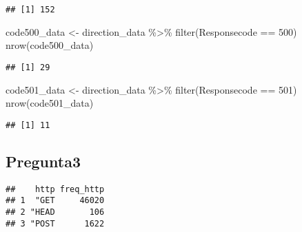 \documentclass[
]{article}
\newenvironment{Shaded}{\begin{snugshade}}{\end{snugshade}}
\newcommand{\AttributeTok}[1]{\textcolor[rgb]{0.77,0.63,0.00}{#1}}
\newcommand{\CommentTok}[1]{\textcolor[rgb]{0.56,0.35,0.01}{\textit{#1}}}
\newcommand{\DecValTok}[1]{\textcolor[rgb]{0.00,0.00,0.81}{#1}}
\newcommand{\FunctionTok}[1]{\textcolor[rgb]{0.00,0.00,0.00}{#1}}
\newcommand{\NormalTok}[1]{#1}
\newcommand{\OtherTok}[1]{\textcolor[rgb]{0.56,0.35,0.01}{#1}}
\newcommand{\SpecialCharTok}[1]{\textcolor[rgb]{0.00,0.00,0.00}{#1}}
\begin{document}
\begin{verbatim}
## [1] 152
\end{verbatim}

\begin{Shaded}
\begin{Highlighting}[]
\NormalTok{code500\_data }\OtherTok{\textless{}{-}}\NormalTok{ direction\_data }\SpecialCharTok{\%\textgreater{}\%} \FunctionTok{filter}\NormalTok{(Responsecode }\SpecialCharTok{==} \DecValTok{500}\NormalTok{)}
\FunctionTok{nrow}\NormalTok{(code500\_data)}
\end{Highlighting}
\end{Shaded}

\begin{verbatim}
## [1] 29
\end{verbatim}

\begin{Shaded}
\begin{Highlighting}[]
\NormalTok{code501\_data }\OtherTok{\textless{}{-}}\NormalTok{ direction\_data }\SpecialCharTok{\%\textgreater{}\%} \FunctionTok{filter}\NormalTok{(Responsecode }\SpecialCharTok{==} \DecValTok{501}\NormalTok{)}
\FunctionTok{nrow}\NormalTok{(code501\_data)}
\end{Highlighting}
\end{Shaded}

\begin{verbatim}
## [1] 11
\end{verbatim}

\hypertarget{pregunta3}{%
\subsection{Pregunta3}\label{pregunta3}}

\begin{Shaded}
\end{Shaded}

\begin{verbatim}
##    http freq_http
## 1  "GET     46020
## 2 "HEAD       106
## 3 "POST      1622
\end{verbatim}
\end{document}

